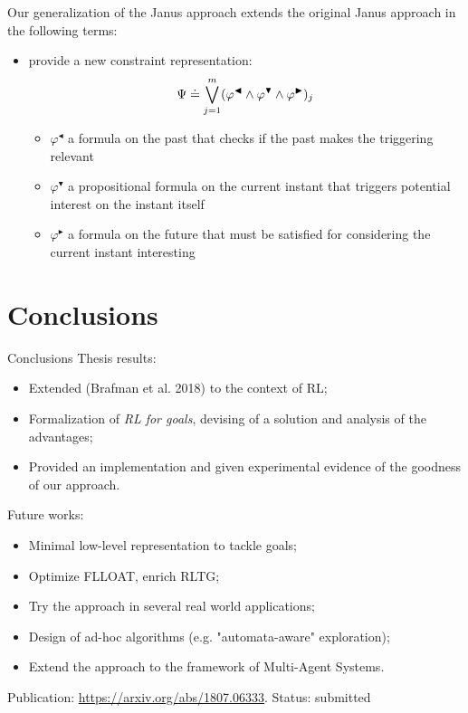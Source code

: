\documentclass{beamer}
\begin{document}
\begin{frame}
Our generalization of the Janus approach extends the original Janus approach in the following terms:
\begin{itemize}
\item provide a new constraint representation:
\begin{align}
\Psi \doteq \bigvee^{m}_{j=1} (\varphi^{\blacktriangleleft} \wedge \varphi^{\blacktriangledown} \wedge \varphi^{\blacktriangleright})_j
\end{align}
\begin{itemize}
\item $\varphi^{\blacktriangleleft}$ a formula on the past that checks if the past makes the triggering relevant
\item $\varphi^{\blacktriangledown}$ a propositional formula on the current instant that triggers potential interest on the instant itself
\item $\varphi^{\blacktriangleright}$ a formula on the future that must be satisfied for considering the current instant interesting
\end{itemize}
\end{itemize}

\end{frame}

\section{Conclusions}
\begin{frame}{Conclusions}
	Thesis results:
	\begin{itemize}
		\item Extended (Brafman et al. 2018) to the context of RL;
		\item Formalization of \emph{RL for \LLf goals}, devising of a solution and analysis of the advantages;
		\item Provided an implementation and given experimental evidence of the goodness of our approach.
	\end{itemize}
	Future works:
	\begin{itemize}
		\item Minimal low-level representation to tackle \LLf goals;
		\item Optimize FLLOAT, enrich RLTG;
		\item Try the approach in several real world applications;
		\item Design of ad-hoc algorithms (e.g. "automata-aware" exploration);
		\item Extend the approach to the framework of Multi-Agent Systems.
	\end{itemize}
	Publication: \href{https://arxiv.org/abs/1807.06333}{https://arxiv.org/abs/1807.06333}. Status: submitted
	
\end{frame}
\end{document}
